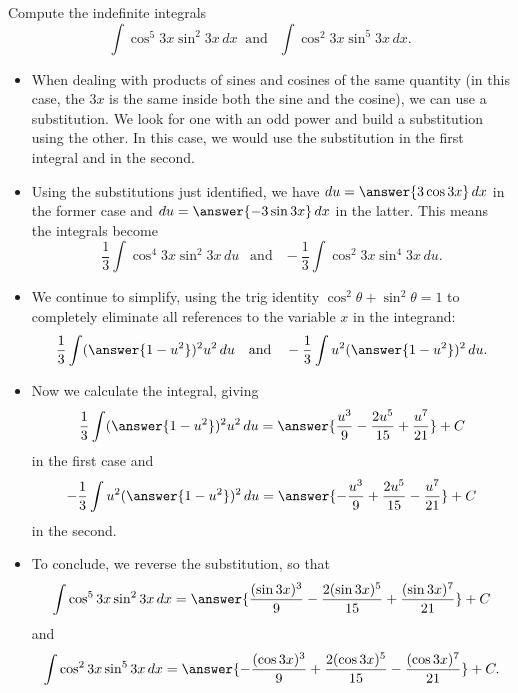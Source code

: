 \documentclass{ximera}
\begin{document}
\begin{example}
Compute the indefinite integrals
\[ \int \cos^5 3x \sin^2 3x \, dx \ \text{ and } \ \ \int \cos^2 3x \sin^5 3x \, dx. \]
\begin{itemize}
\item When dealing with products of sines and cosines of the same quantity (in this case, the $3x$ is the same inside both the sine and the cosine), we can use a substitution. We look for one with an odd power and build a substitution using the other.   In this case, we would use the substitution  in the first integral and  in the second.
\item Using the substitutions just identified, we have $du = \answer{3 \cos 3x} \, dx$ in the former case and $du = \answer{-3 \sin 3x}\, dx$ in the latter. This means the integrals become
\[ \frac{1}{3} \int \cos^4 3x \sin^2 3x \, du \ \ \text{ and } \ \ - \frac{1}{3} \int \cos^2 3x \sin^4 3x \, du. \]
\item We continue to simplify, using the trig identity $\cos^2 \theta + \sin^2 \theta = 1$ to completely eliminate all references to the variable $x$ in the integrand:
\[ \frac{1}{3} \int (\answer{1-u^2})^2 u^2 \, du \ \ \text{ and } \ \ - \frac{1}{3} \int u^2 (\answer{1-u^2})^2 \, du. \]
\item Now we calculate the integral, giving 
\[ \frac{1}{3} \int (\answer{1-u^2})^2 u^2 \, du = \answer{\frac{u^3}{9} - \frac{2 u^5}{15} + \frac{u^7}{21}} + C \]
in the first case and
\[ -\frac{1}{3} \int u^2 (\answer{1-u^2})^2 \, du = \answer{-\frac{u^3}{9} + \frac{2 u^5}{15} - \frac{u^7}{21}} + C \]
in the second.
\item To conclude, we reverse the substitution, so that
\[  \int \cos^5 3x \sin^2 3x \, dx = \answer{\frac{(\sin 3x)^3}{9} - \frac{2 (\sin 3x)^5}{15} + \frac{(\sin 3x)^7}{21}} + C \]
and
\[ \int \cos^2 3x \sin^5 3x \, dx = \answer{-\frac{(\cos 3x)^3}{9} + \frac{2 (\cos 3x)^5}{15} - \frac{(\cos 3x)^7}{21}} + C. \]
\end{itemize}
\end{example}
\end{document}
